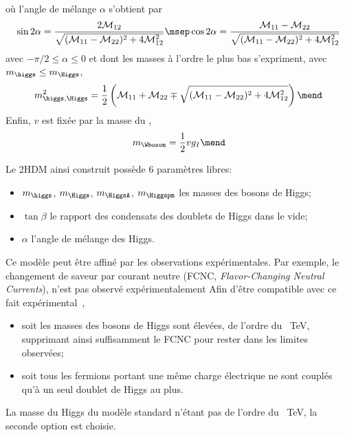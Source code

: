 où l'angle de mélange $\alpha$ s'obtient par
\begin{equation}
\sin 2\alpha = \frac{2\mathcal{M}_{12}}{\sqrt{(\mathcal{M}_{11}-\mathcal{M}_{22})^2+4\mathcal{M}_{12}^2}}
\msep
\cos 2\alpha = \frac{\mathcal{M}_{11}-\mathcal{M}_{22}}{\sqrt{(\mathcal{M}_{11}-\mathcal{M}_{22})^2+4\mathcal{M}_{12}^2}}
\end{equation}
avec $-\pi/2\leq\alpha\leq0$
et
dont les masses à l'ordre le plus bas s'expriment, avec $m_{\higgs} \leq m_{\Higgs}$,
\begin{equation}
m_{\higgs,\Higgs}^2 = \frac{1}{2} \left( \mathcal{M}_{11} + \mathcal{M}_{22} \mp \sqrt{(\mathcal{M}_{11}-\mathcal{M}_{22})^2+4\mathcal{M}_{12}^2} \right)
\mend
\end{equation}
Enfin, $v$ est fixée par la masse du \Wboson,
\begin{equation}
m_{\Wboson} = \frac{1}{2}vg_I
\label{eq-2HDM_W_mass}
\mend
\end{equation}
\par Le 2HDM ainsi construit possède 6 paramètres libres:
\begin{itemize}
\item $m_{\higgs}$, $m_{\Higgs}$, $m_{\HiggsA}$, $m_{\Higgspm}$ les masses des bosons de Higgs;
\item $\tan\beta$ le rapport des condensats des doublets de Higgs dans le vide;
\item $\alpha$ l'angle de mélange des Higgs.
\end{itemize}
\par Ce modèle peut être affiné par les observations expérimentales.
Par exemple, le changement de saveur par courant neutre (FCNC, \emph{Flavor-Changing Neutral Currents}), n'est pas observé expérimentalement
Afin d'être compatible avec ce fait expérimental~\cite{Higgs_hunter_guide},
\begin{itemize}
\item soit les masses des bosons de Higgs sont élevées, de l'ordre du \SI{}{\TeV}, supprimant ainsi suffisamment le FCNC pour rester dans les limites observées;
\item soit tous les fermions portant une même charge électrique ne sont couplés qu'à un seul doublet de Higgs au plus.
\end{itemize}
La masse du Higgs du modèle standard n'étant pas de l'ordre du \SI{}{\TeV}, la seconde option est choisie.
